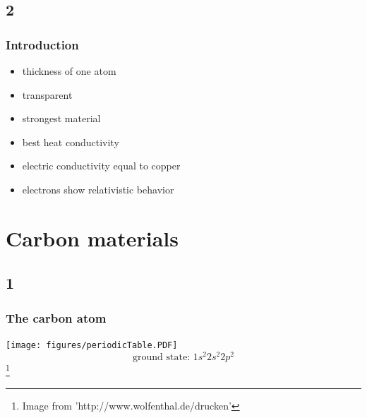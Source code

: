 \documentclass{beamer}
\newcommand\blfootnote[1]{%
  \begingroup
  \renewcommand\thefootnote{}\footnote{#1}%
  \addtocounter{footnote}{-1}%
  \endgroup
}
\begin{document}
		\subsection*{2}
		\begin{frame}
			\frametitle{Introduction}
			\centering
			\begin{itemize}
				\item thickness of one atom
				\vspace{0.3cm}
				\item transparent
				\vspace{0.3cm}
				\item strongest material
				\vspace{0.3cm}
				\item best heat conductivity
				\vspace{0.3cm}
				\item electric conductivity equal to copper
				\vspace{0.3cm}
				\item electrons show relativistic behavior 
			\end{itemize}
		\end{frame}


\section{Carbon materials}
	\subsection*{1}
	
		\begin{frame}
			\frametitle{The carbon atom}
			\centering
			\texttt{[image: figures/periodicTable.PDF]}	
			\begin{equation}
				\text{ground state: } 1s^2 2s^2 2p^2
			\end{equation}
			\blfootnote{Image from 'http://www.wolfenthal.de/drucken' }
		\end{frame}
\end{document}
